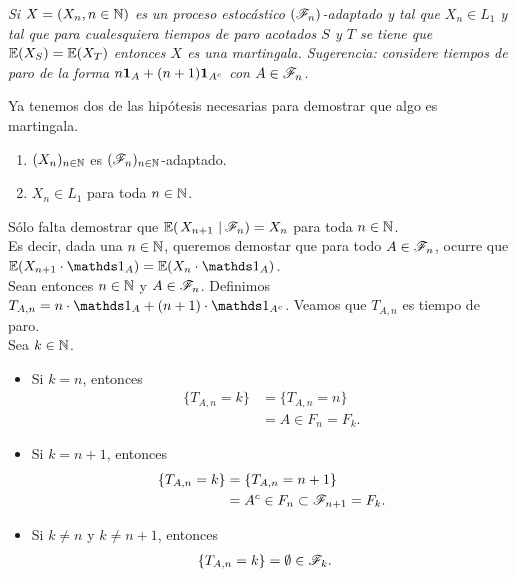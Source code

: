 \emph{
	Si $X=\left( X_n,n\in\mathbb{N}\right) $ es un proceso estoc\'astico $\left( \mathscr{F}_n\right) $-adaptado y tal que $X_n\in L_1$ y tal que 
	para cualesquiera tiempos de paro acotados $S$ y $T$ se tiene que $\mathbb{E}\! \left( X_S \right)=\mathbb{E}\! \left( X_T \right)$ entonces $X$ es una 
	martingala. Sugerencia: considere tiempos de paro de la forma $n{\bf{1}}_{A}+(n+1){\bf{1}}_{A^c}$ con $A\in\mathscr{F}_n$.\\
}

	Ya tenemos dos de las hipótesis necesarias para demostrar que algo es martingala.
\begin{enumerate}
	\item 
		$(X_n)_{n\in\mathbb{N}}$ es $(\mathscr{F}_n)_{n \in \mathbb{N}}$-adaptado.

	\item 
		$X_n \in L_1$ para toda $n \in \mathbb{N}$. 
\end{enumerate}
\null

	Sólo falta demostrar que $\espc{X_{n+1}}{\F_n} = X_n$ para toda $n \in \mathbb{N}$.\\

	Es decir, dada una $n \in \mathbb{N}$, queremos demostar que para todo $A \in \mathscr{F}_n$,
ocurre que $\E(X_{n+1} \cdot \indic_{A}) = \E(X_{n} \cdot \indic_{A})$.\\

	Sean entonces $n \in \mathbb{N}$ y $A \in \mathscr{F}_n$. Definimos $T_{A,n} = n\cdot\indic_{A} + (n+1) \cdot \indic_{A^c}$. 
Veamos que $T_{A, n}$ es tiempo de paro.\\

	Sea $k \in \mathbb{N}$.

\begin{itemize}
	\item 
		Si $k = n$, entonces 
		\begin{align}
			\{T_{A, n} = k\} 	&= \{T_{A, n} = n\} \\
								&= A \in F_n = F_k.
		\end{align}
		
	\item
		Si $k = n + 1$, entonces 
		\begin{align}
			\{T_{A, n} = k\} 	&= \{T_{A, n} = n + 1\} \\
								&= A^c \in F_n \subset \mathscr{F}_{n+1} = F_k.
		\end{align}

	\item 
		Si $k \not= n$ y $k \not= n+1$, entonces
		\begin{align}
			\{T_{A, n} = k\} 	&= \emptyset \in \mathscr{F}_k.
		\end{align}
\end{itemize}

